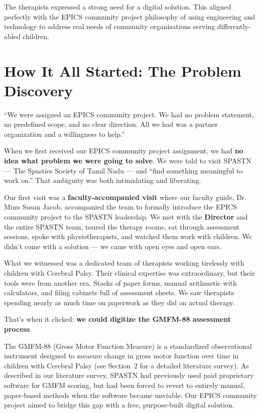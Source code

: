 \documentclass[11pt,a4paper]{article}
\begin{document}
The therapists expressed a strong need for a digital solution. This aligned perfectly with the EPICS community project philosophy of using engineering and technology to address real needs of community organizations serving differently-abled children.

\section{How It All Started: The Problem Discovery}

\begin{quotecallout}
``We were assigned an EPICS community project. We had no problem statement, no predefined scope, and no clear direction. All we had was a partner organization and a willingness to help.''
\end{quotecallout}

When we first received our EPICS community project assignment, we had \textbf{no idea what problem we were going to solve}. We were told to visit SPASTN --- The Spastics Society of Tamil Nadu --- and ``find something meaningful to work on.'' That ambiguity was both intimidating and liberating.

Our first visit was a \textbf{faculty-accompanied visit} where our faculty guide, Dr. Minu Susan Jacob, accompanied the team to formally introduce the EPICS community project to the SPASTN leadership. We met with the \textbf{Director} and the entire SPASTN team, toured the therapy rooms, sat through assessment sessions, spoke with physiotherapists, and watched them work with children. We didn't come with a solution --- we came with open eyes and open ears.

What we witnessed was a dedicated team of therapists working tirelessly with children with Cerebral Palsy. Their clinical expertise was extraordinary, but their tools were from another era. Stacks of paper forms, manual arithmetic with calculators, and filing cabinets full of assessment sheets. We saw therapists spending nearly as much time on paperwork as they did on actual therapy.

That's when it clicked: \textbf{we could digitize the GMFM-88 assessment process}.

The GMFM-88 (Gross Motor Function Measure) is a standardized observational instrument designed to measure change in gross motor function over time in children with Cerebral Palsy (see Section~2 for a detailed literature survey). As described in our literature survey, SPASTN had previously used paid proprietary software for GMFM scoring, but had been forced to revert to entirely manual, paper-based methods when the software became unviable. Our EPICS community project aimed to bridge this gap with a free, purpose-built digital solution.
\end{document}
